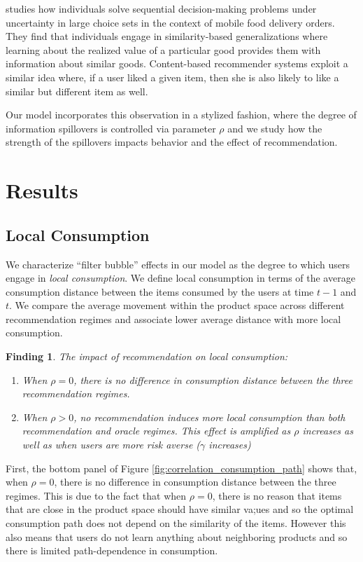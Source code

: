 \documentclass[sigconf]{acmart}
\newtheorem{finding}{Finding}
\begin{document}
\cite{schulz2019structured} studies how individuals solve sequential decision-making problems under uncertainty in large choice sets in the context of mobile food delivery orders. They find that individuals engage in similarity-based generalizations where learning about the realized value of a particular good provides them with information about similar goods. Content-based recommender systems exploit a similar idea where, if a user liked a given item, then she is also likely to like a similar but different item as well.
\par

Our model incorporates this observation in a stylized fashion, where the degree of information spillovers is controlled via parameter $\rho$ and we study how the strength of the spillovers impacts behavior and the effect of recommendation.
\par

\section{Results}
\subsection{Local Consumption}
We characterize ``filter bubble'' effects in our model as the degree to which users engage in \textit{local consumption}. We define local consumption in terms of the average consumption distance between the items consumed by the users at time $t-1$ and $t$. We compare the average movement within the product space across different recommendation regimes and associate lower average distance with more local consumption.



\begin{finding}\label{finding_local_consumption}
The impact of recommendation on local consumption:
\begin{enumerate}
\item When $\rho = 0$, there is no difference in consumption distance between the three recommendation regimes.
\item When $\rho > 0$, no recommendation induces more local consumption than both recommendation and oracle regimes. This effect is amplified as $\rho$ increases as well as when users are more risk averse ($\gamma$ increases)
\end{enumerate}
\end{finding}

First, the bottom panel of Figure \ref{fig:correlation_consumption_path} shows that, when $\rho = 0$, there is no difference in consumption distance between the three regimes. This is due to the fact that when $\rho = 0$, there is no reason that items that are close in the product space should have similar va;ues and so the optimal consumption path does not depend on the similarity of the items. However this also means that users do not learn anything about neighboring products and so there is limited path-dependence in consumption.
\par
\end{document}
